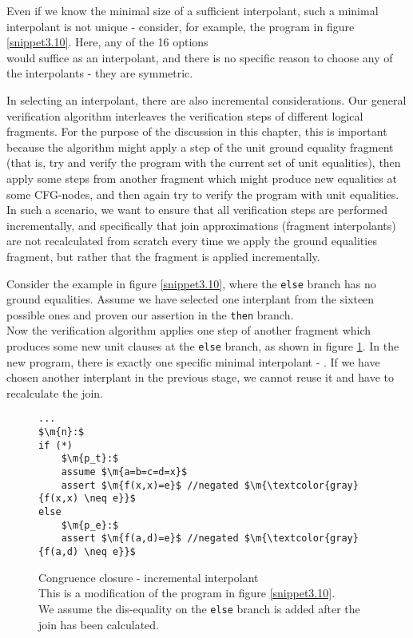 Even if we know the minimal size of a sufficient interpolant, such a minimal interpolant is not unique - consider, for example, the program in figure \ref{snippet3.10}.
Here, any of the 16 options \\
 would suffice as an interpolant, 
and there is no specific reason to choose any of the interpolants - they are symmetric.

In selecting an interpolant, there are also incremental considerations. 
Our general verification algorithm interleaves the verification steps of different logical fragments.
For the purpose of the discussion in this chapter, this is important because the algorithm might apply a step of the unit ground equality fragment (that is, try and verify the program with the current set of unit equalities), then apply some steps from another fragment which might produce new equalities at some CFG-nodes, and then again try to verify the program with unit equalities. In such a scenario, we want to ensure that all verification steps are performed incrementally, and specifically that join approximations (fragment interpolants) are not recalculated from scratch every time we apply the ground equalities fragment, but rather that the fragment is applied incrementally.

Consider the example in figure \ref{snippet3.10}, where the \lstinline|else| branch has no ground equalities.
Assume we have selected one interplant from the sixteen possible ones and proven our assertion in the \lstinline|then| branch.\\
Now the verification algorithm applies one step of another fragment which produces some new unit clauses at the \lstinline|else| branch, as shown in figure \ref{snippet3.10a}. In the new program, there is exactly one specific minimal interpolant - .
If we have chosen another interplant in the previous stage, we cannot reuse it and have to recalculate the join.

\begin{figure}
\begin{lstlisting}
...
$\m{n}:$
if (*)
	$\m{p_t}:$
	assume $\m{a=b=c=d=x}$
	assert $\m{f(x,x)=e}$ //negated $\m{\textcolor{gray}{f(x,x) \neq e}}$
else
	$\m{p_e}:$
	assert $\m{f(a,d)=e}$ //negated $\m{\textcolor{gray}{f(a,d) \neq e}}$
\end{lstlisting}
\caption{Congruence closure - incremental interpolant\\
This is a modification of the program in figure \ref{snippet3.10}.\\
We assume the dis-equality on the \lstinline|else| branch is added after the join has been calculated.
}
\label{snippet3.10a}
\end{figure}
\noindent

